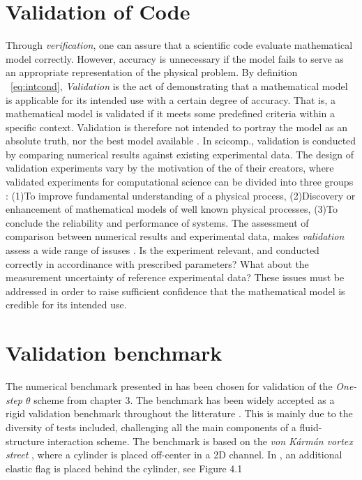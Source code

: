 \section{Validation of Code}
Through \textit{verification}, one can assure that a scientific code evaluate mathematical model correctly. However, accuracy is unnecessary if the model fails to serve as an appropriate representation of the physical problem. By definition ~\ref{eq:intcond}, \textit{Validation} is the act of demonstrating that a mathematical model is applicable for its intended use with a certain degree of accuracy. That is, a mathematical model is validated if it meets some predefined criteria within a specific context. Validation is therefore not intended to portray the model as an absolute truth, nor the best model available \cite{Rykiel1996}. In scicomp., validation is conducted by comparing numerical results against existing experimental data. The design of validation experiments vary by the motivation of the of their creators, where validated experiments for computational science can be divided into three groups \cite{Sommerville2006}: (1)To improve fundamental understanding of a physical process, (2)Discovery or enhancement of mathematical models of well known physical processes, (3)To conclude the reliability and performance of systems. The assessment of comparison between numerical results and experimental data, makes \textit{validation} assess a wide range of issuses \cite{Sommerville2006}. Is the experiment relevant, and  conducted correctly in accordinance with prescribed parameters? What about the measurement uncertainty of reference experimental data? These issues  must be addressed in order to raise sufficient confidence that the mathematical model is credible for its intended use. \\


 \newpage
 
\section{Validation benchmark}
The numerical benchmark presented in \cite{Hron2006} has been chosen for validation of the \textit{One-step $\theta$} scheme from chapter 3. The benchmark has been widely accepted as a rigid validation benchmark  throughout the litterature \cite{Wickb, Wick, V2013, Gatzhammer2014}. This is mainly due to the diversity of tests included, challenging all the main components of a fluid-structure interaction scheme. The benchmark is based on the \textit{von Kármán vortex street} \cite{White}, where a cylinder is placed off-center in a 2D channel. In \cite{Hron2006}, an additional elastic flag is placed behind the cylinder, see Figure 4.1

